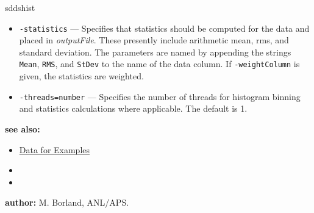 \begin{sddsprog}{sddshist}
\begin{itemize}
      \item \verb|-statistics| --- Specifies that statistics should be computed for the data and placed in \emph{outputFile}. These presently include arithmetic mean, rms, and standard deviation. The parameters are named by appending the strings \verb|Mean|, \verb|RMS|, and \verb|StDev| to the name of the data column. If \verb|-weightColumn| is given, the statistics are weighted.
      \item \verb|-threads=number| --- Specifies the number of threads for histogram binning and statistics calculations where applicable. The default is 1.
    \end{itemize}
  \item \textbf{see also:}
    \begin{itemize}
      \item \hyperref[exampleData]{Data for Examples}
      \item {}
      \item {}
    \end{itemize}
  \item \textbf{author:} M. Borland, ANL/APS.
\end{sddsprog}
